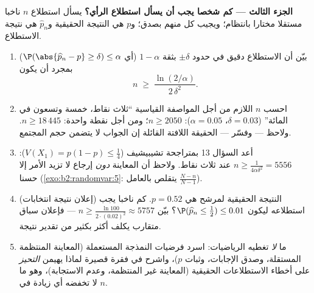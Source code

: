\begin{problem}
\medskip
\noindent\textbf{الجزء الثالث --- كم شخصا يجب أن يسأل استطلاع
الرأي؟} يسأل استطلاع $n$ ناخبا مستقلا مختارا بانتظام؛ ويجيب كل
منهم بصدق؛ و$p$ هي النتيجة الحقيقية و$\widehat p_n$ هي نتيجة الاستطلاع.
\begin{enumerate}[resume]
  \item بيّن أن الاستطلاع دقيق في حدود $\pm\delta$ بثقة $1 - \alpha$ (أي
        $\P(\abs{\widehat p_n - p} \geq \delta) \leq \alpha$) بمجرد أن يكون
        \[
        n \;\geq\; \frac{\ln(2/\alpha)}{2\,\delta^2} .
        \]
  \item احسب $n$ اللازم من أجل المواصفة القياسية ``ثلاث نقاط،
        خمسة وتسعون في المائة'' ($\delta
        = 0.03$، $\alpha = 0.05$): $n \geq 2050$؛ ومن أجل
        نقطة واحدة: $n \geq 18\,445$. ولاحظ --- وفسّر --- الحقيقة اللافتة
        القائلة إن الجواب لا يتضمن حجم المجتمع.
  \item أعد السؤال 13 بمتراجحة تشيبيشيف ($V(X_1) = p(1-p)
        \leq \frac14$): $n \geq \frac1{4\alpha\delta^2} =
        5556$ عند ثلاث
        نقاط. ولاحظ أن المعاينة \emph{دون} إرجاع لا تزيد الأمر إلا
        حسنا (\cref{exo:b2:randomvar:5}:  يتقلص بالعامل $\frac{N-n}{N-1}$).
  \item (إعلان نتيجة انتخابات) النتيجة الحقيقية لمرشح هي $p
        = 0.52$. كم
        ناخبا يجب استطلاعه ليكون $\P(\widehat p_n \leq \tfrac12) \leq 0.01$؟ بيّن $n
        \geq \frac{\ln 100}{2\cdot(0.02)^2} \approx 5757$ --- فإعلان
        سباق متقارب يكلف أكثر بكثير من تقدير نتيجة.
  \item ما \emph{لا} تغطيه الرياضيات: اسرد فرضيات النمذجة المستعملة
        (المعاينة المنتظمة المستقلة، وصدق الإجابات، وثبات $p$)،
        واشرح في فقرة قصيرة لماذا يهيمن \emph{التحيز} على أخطاء
        الاستطلاعات الحقيقية (المعاينة غير المنتظمة، وعدم الاستجابة)،
        وهو ما لا تخفضه أي زيادة في $n$.
\end{enumerate}


\end{problem}
